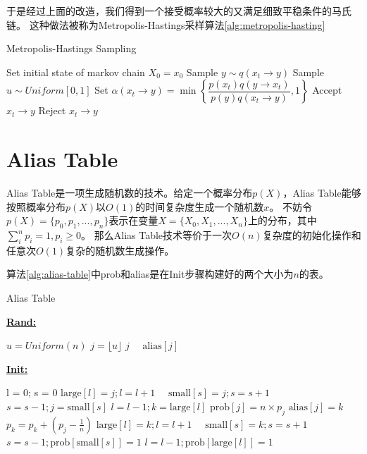 于是经过上面的改造，我们得到一个接受概率较大的又满足细致平稳条件的马氏链。
这种做法被称为Metropolis-Hastings采样算法\ref{alg:metropolis-hasting}
\begin{algorithm}[htb]  
\caption{Metropolis-Hastings Sampling} 
\label{alg:metropolis-hasting} 
\begin{algorithmic}[1] 
\State Set initial state of markov chain $X_0 = x_0$
\State Sample $y \sim q(x_t \rightarrow y)$
\State Sample $u \sim Uniform[0,1]$
\State Set $\alpha( x_t \rightarrow y) = \min \left\{ \dfrac{p(x_t)q(y \rightarrow x_t)}{p(y)q(x_t \rightarrow y)}, 1\right\}$
\State Accept $x_t \rightarrow y$
\Else
\State Reject $x_t \rightarrow y$
\EndIf
\EndFor
\end{algorithmic}  
\end{algorithm}  

\section{Alias Table}

Alias Table\cite{vose1991a}是一项生成随机数的技术。给定一个概率分布$p(X)$，Alias Table能够按照概率分布$p(X)$以$O(1)$的时间复杂度生成一个随机数$x$。
不妨令$p(X) = \{p_0, p_1, ..., p_n\}$表示在变量$X=\{X_0, X_1, ..., X_n\}$上的分布，其中$\sum_i^n {p_i} = 1, p_i \ge 0$。
那么Alias Table技术等价于一次$O(n)$复杂度的初始化操作和任意次$O(1)$复杂的随机数生成操作。

算法\ref{alg:alias-table}中prob和alias是在Init步骤构建好的两个大小为$n$的表。

\begin{algorithm}[htb]  
\caption{Alias Table} 
\label{alg:alias-table}
\textbf{\underline{Rand:}}
\begin{algorithmic}[1] 
\State $u = Uniform(n)$
\State $j = \lfloor u \rfloor$
\Return $j$
\Else
~~\Return $\mbox{alias}[j]$
\EndIf
\end{algorithmic}  
\textbf{\underline{Init:}}
\begin{algorithmic}[1] 
\State l = 0; s = 0
$\mbox{large}[l] = j; l = l + 1$
\Else
~~$\mbox{small}[s] = j; s = s + 1$
\EndIf
\EndFor
{}
\State $s = s - 1; j = \mbox{small}[s]$
\State $l = l - 1; k = \mbox{large}[l]$
\State $\mbox{prob}[j] = n \times p_j$
\State $\mbox{alias}[j] = k$
\State $p_k = p_k + (p_j - \frac{1}{n})$
$\mbox{large}[l] = k; l = l + 1$
\Else
~~$\mbox{small}[s] = k; s = s + 1$
\EndIf
\EndWhile
{}
$s = s - 1; \mbox{prob}[\mbox{small}[s]] = 1$
\EndWhile
{}
$l = l - 1; \mbox{prob}[\mbox{large}[l]] = 1$ \EndWhile
\end{algorithmic}  
\end{algorithm}  

